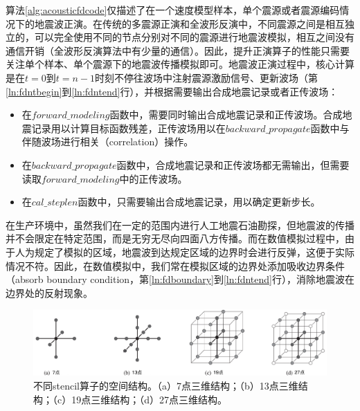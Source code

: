 \documentclass[degree=doctor]{thuthesis}
\begin{document}
算法\ref{alg:acousticfdcode}仅描述了在一个速度模型样本，单个震源或者震源编码情况下的地震波正演。在传统的多震源正演和全波形反演中，不同震源之间是相互独立的，可以完全使用不同的节点分别对不同的震源进行地震波模拟，相互之间没有通信开销（全波形反演算法中有少量的通信）。因此，提升正演算子的性能只需要关注单个样本、单个震源下的地震波传播模拟即可。地震波正演过程中，核心计算是在$t=0$到$t=n-1$时刻不停往波场中注射震源激励信号、更新波场（第\ref{ln:fdntbegin}到\ref{ln:fdntend}行），并根据需要输出合成地震记录或者正传波场：
\begin{itemize}
  \item 在$forward\_modeling$函数中，需要同时输出合成地震记录和正传波场。合成地震记录用以计算目标函数残差，正传波场用以在$backward\_propagate$函数中与伴随波场进行相关（correlation）操作。
  \item 在$backward\_propagate$函数中，合成地震记录和正传波场都无需输出，但需要读取$forward\_modeling$中的正传波场。
  \item 在$cal\_steplen$函数中，只需要输出合成地震记录，用以确定更新步长。
\end{itemize}

在生产环境中，虽然我们在一定的范围内进行人工地震石油勘探，但地震波的传播并不会限定在特定范围，而是无穷无尽向四面八方传播。而在数值模拟过程中，由于人为规定了模拟的区域，地震波到达规定区域的边界时会进行反弹，这便于实际情况不符。因此，在数值模拟中，我们常在模拟区域的边界处添加吸收边界条件（absorb boundary condition，第\ref{ln:fdboundary}到\ref{ln:fdntend}行），消除地震波在边界处的反射现象。

\begin{figure}[ht]
  \centering
  \includegraphics[width=0.9\columnwidth]{stencil7131927.pdf}
  \caption{不同stencil算子的空间结构\cite{zhang2013autogeneration}。（a）7点三维结构；（b）13点三维结构；（c）19点三维结构；（d）27点三维结构。}
  \label{fig:stencilstruct}
\end{figure}
\end{document}
